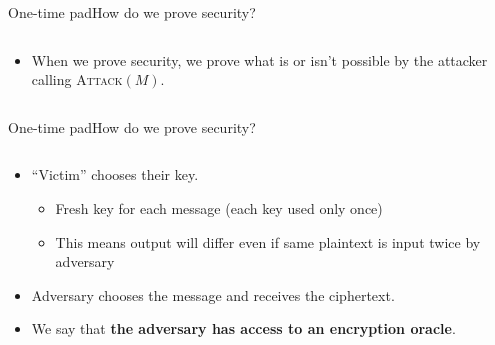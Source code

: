 \documentclass[aspectratio=169, lualatex, handout]{beamer}
\begin{document}
\begin{frame}{One-time pad}{How do we prove security?}
	\begin{columns}[c]
		\begin{column}{0.5\textwidth}
			\begin{itemize}
				\item When we prove security, we prove what is or isn't possible by the attacker calling \textsc{Attack}$(M)$.
			\end{itemize}
		\end{column}
		\begin{column}{0.5\textwidth}
		\end{column}
	\end{columns}
\end{frame}

\begin{frame}{One-time pad}{How do we prove security?}
	\begin{columns}[c]
		\begin{column}{0.5\textwidth}
			\begin{itemize}[<+->]
				\item ``Victim'' chooses their key.
				      \begin{itemize}
					      \item Fresh key for each message (each key used only once)
					      \item This means output will differ even if same plaintext is input twice by adversary
				      \end{itemize}
				\item Adversary chooses the message and receives the ciphertext.
				\item We say that \textbf{the adversary has access to an encryption oracle}.
			\end{itemize}
		\end{column}
		\begin{column}{0.5\textwidth}
		\end{column}
	\end{columns}
\end{frame}
\end{document}
